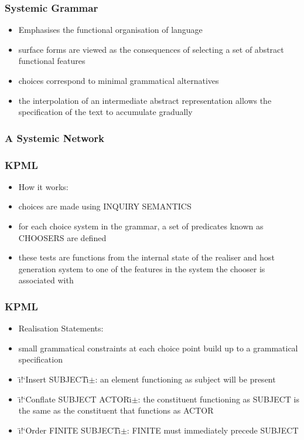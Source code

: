 \documentclass[compress,color=usenames]{beamer}
\begin{document}
\begin{frame}
\frametitle{
Systemic Grammar}

\label{f39}
\begin{itemize}
\item {{Emphasises the functional organisation of language}}
\item {{surface forms are viewed as the consequences of selecting a set of abstract functional features}}
\item {{choices correspond to minimal grammatical alternatives}}
\item {{the interpolation of an intermediate abstract representation allows the specification of the text to accumulate gradually}}
\end{itemize}
 
\end{frame}

\begin{frame}
\frametitle{
A Systemic Network}

\label{f41}
 
\end{frame}

\begin{frame}
\frametitle{
KPML}

\label{f43}
\begin{itemize}
\item {{How it works:}}
\item {{choices are made using INQUIRY SEMANTICS}}
\item {{for each choice system in the grammar, a set of predicates known as CHOOSERS are defined}}
\item {{these tests are functions from the internal state of the realiser and host generation system to one of the features in the system the chooser is associated with}}
\end{itemize}
 
\end{frame}

\begin{frame}
\frametitle{
KPML}

\label{f45}
\begin{itemize}
\item {{Realisation Statements:}}
\item {{small grammatical constraints at each choice point build up to a grammatical specification}}
\item {{\"{\i}!`Insert SUBJECT\"{\i}\mbox{$\pm$}:  an element functioning as subject will be present}}
\item {{\"{\i}!`Conflate SUBJECT ACTOR\"{\i}\mbox{$\pm$}:  the constituent functioning as SUBJECT is the same as the constituent that functions as ACTOR}}
\item {{\"{\i}!`Order FINITE SUBJECT\"{\i}\mbox{$\pm$}:  FINITE must immediately precede SUBJECT}}
\end{itemize}
 
\end{frame}
\end{document}
